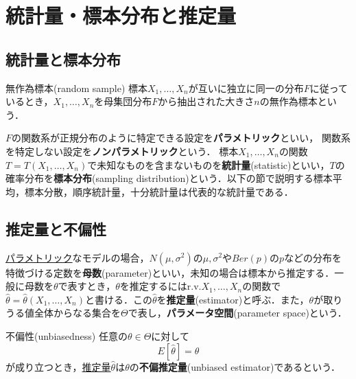 \documentclass[main.tex]{subfiles}
\begin{document}
\section{統計量・標本分布と推定量}

\subsection{統計量と標本分布}

\begin{mydefinition}{無作為標本(random sample)}
\label{def:random_sample} %
標本$X_1, \dots , X_n$が互いに独立に同一の分布$F$に従っているとき，$X_1, \dots,X_n$を母集団分布$F$から抽出された大きさ$n$の無作為標本という．
\end{mydefinition}

$F$の関数系が正規分布のように特定できる設定を\textbf{\hypertarget{def:parametric}{パラメトリック}}といい，
関数系を特定しない設定を\textbf{\hypertarget{def:nonparametric}{ノンパラメトリック}}という．
標本$X_1,\dots,X_n$の関数$T=T(X_1,\dots,X_n)$で未知なものを含まないものを\textbf{\hypertarget{def:statistic}{統計量}}(statistic)といい，$T$の確率分布を\textbf{標本分布}(sampling distribution)という．以下の節で説明する標本平均，標本分散，順序統計量，十分統計量は代表的な統計量である．

\subsection{推定量と不偏性}
\hyperlink{def:parametric}{パラメトリック}なモデルの場合，$N(\mu, \sigma^2)$の$\mu, \sigma^2$や$Ber(p)$の$p$などの分布を特徴づける定数を\textbf{\hypertarget{def:parameter}{母数}}(parameter)といい，未知の場合は標本から推定する．一般に母数を$\theta$で表すとき，$\theta$を推定するにはr.v.\quad$X_1, \dots, X_n$の関数で$\hat{\theta} = \hat{\theta}(X_1, \dots, X_n)$と書ける．この$\hat{\theta}$を\textbf{\hypertarget{def:estimator}{推定量}}(estimator)と呼ぶ．また，$\theta$が取りうる値全体からなる集合を$\Theta$で表し，\textbf{パラメータ空間}(parameter space)という．

\begin{mydefinition}{不偏性(unbiasedness)}
\label{def:unbiasedness} %
  任意の$\theta \in \Theta$に対して
  \begin{equation}
    E[\hat{\theta}] = \theta
  \end{equation}
  が成り立つとき，\hyperlink{def:estimator}{推定量}$\hat{\theta}$は$\theta$の\textbf{不偏推定量}(unbiased estimator)であるという．
\end{mydefinition}
\end{document}
